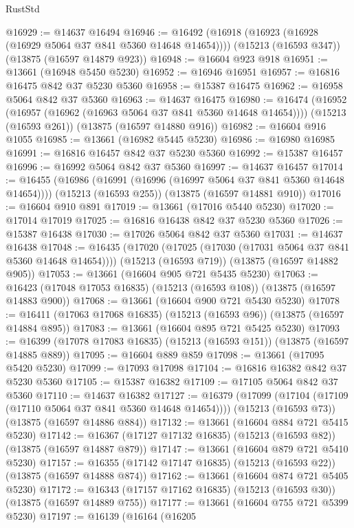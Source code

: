 \begin{lexlean}{RustStd}
\begin{coremodule}
@16929 := @14637 @16494
@16946 := @16492
    (@16918 (@16923 (@16928 (@16929 @5064 @37 @841 @5360 @14648 @14654))))
    (@15213 (@16593 @347))
    (@13875 (@16597 @14879 @923))
@16948 := @16604 @923 @918
@16951 := @13661 (@16948 @5450 @5230)
@16952 := @16946 @16951
@16957 := @16816 @16475 @842 @37 @5230 @5360
@16958 := @15387 @16475
@16962 := @16958 @5064 @842 @37 @5360
@16963 := @14637 @16475
@16980 := @16474
    (@16952 (@16957 (@16962 (@16963 @5064 @37 @841 @5360 @14648 @14654))))
    (@15213 (@16593 @261))
    (@13875 (@16597 @14880 @916))
@16982 := @16604 @916 @1055
@16985 := @13661 (@16982 @5445 @5230)
@16986 := @16980 @16985
@16991 := @16816 @16457 @842 @37 @5230 @5360
@16992 := @15387 @16457
@16996 := @16992 @5064 @842 @37 @5360
@16997 := @14637 @16457
@17014 := @16455
    (@16986 (@16991 (@16996 (@16997 @5064 @37 @841 @5360 @14648 @14654))))
    (@15213 (@16593 @255))
    (@13875 (@16597 @14881 @910))
@17016 := @16604 @910 @891
@17019 := @13661 (@17016 @5440 @5230)
@17020 := @17014 @17019
@17025 := @16816 @16438 @842 @37 @5230 @5360
@17026 := @15387 @16438
@17030 := @17026 @5064 @842 @37 @5360
@17031 := @14637 @16438
@17048 := @16435
    (@17020 (@17025 (@17030 (@17031 @5064 @37 @841 @5360 @14648 @14654))))
    (@15213 (@16593 @719))
    (@13875 (@16597 @14882 @905))
@17053 := @13661 (@16604 @905 @721 @5435 @5230)
@17063 := @16423 (@17048 @17053 @16835) (@15213 (@16593 @108)) (@13875 (@16597 @14883 @900))
@17068 := @13661 (@16604 @900 @721 @5430 @5230)
@17078 := @16411 (@17063 @17068 @16835) (@15213 (@16593 @96)) (@13875 (@16597 @14884 @895))
@17083 := @13661 (@16604 @895 @721 @5425 @5230)
@17093 := @16399 (@17078 @17083 @16835) (@15213 (@16593 @151)) (@13875 (@16597 @14885 @889))
@17095 := @16604 @889 @859
@17098 := @13661 (@17095 @5420 @5230)
@17099 := @17093 @17098
@17104 := @16816 @16382 @842 @37 @5230 @5360
@17105 := @15387 @16382
@17109 := @17105 @5064 @842 @37 @5360
@17110 := @14637 @16382
@17127 := @16379
    (@17099 (@17104 (@17109 (@17110 @5064 @37 @841 @5360 @14648 @14654))))
    (@15213 (@16593 @73))
    (@13875 (@16597 @14886 @884))
@17132 := @13661 (@16604 @884 @721 @5415 @5230)
@17142 := @16367 (@17127 @17132 @16835) (@15213 (@16593 @82)) (@13875 (@16597 @14887 @879))
@17147 := @13661 (@16604 @879 @721 @5410 @5230)
@17157 := @16355 (@17142 @17147 @16835) (@15213 (@16593 @22)) (@13875 (@16597 @14888 @874))
@17162 := @13661 (@16604 @874 @721 @5405 @5230)
@17172 := @16343 (@17157 @17162 @16835) (@15213 (@16593 @30)) (@13875 (@16597 @14889 @755))
@17177 := @13661 (@16604 @755 @721 @5399 @5230)
@17197 := @16139
    (@16164
      (@16205

\end{coremodule}
\end{lexlean}
